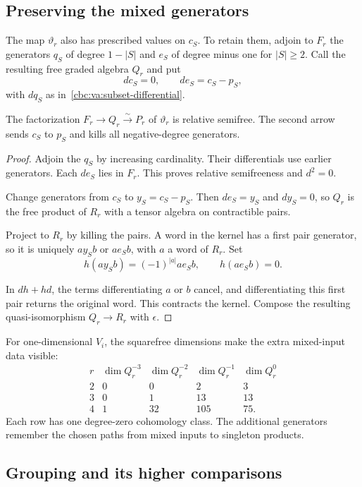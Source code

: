 \subsection{Preserving the mixed generators}

The map $\vartheta_r$ also has prescribed values
on $c_S$. To retain them, adjoin to $F_r$ the
generators $q_S$ of degree $1-|S|$ and $e_S$ of
degree minus one for $|S|\geq2$. Call the resulting
free graded algebra $Q_r$ and put
\[
 dc_S=0,\qquad de_S=c_S-p_S,
\]
with $dq_S$ as in~\eqref{cbc:va:subset-differential}.

\begin{theorem}\label{cbc:va:relative-resolution}
The factorization $F_r\longrightarrow Q_r
\xrightarrow{\sim}P_r$ of $\vartheta_r$ is
relative semifree. The second arrow sends $c_S$
to $p_S$ and kills all negative-degree generators.
\end{theorem}
\begin{proof}
Adjoin the $q_S$ by increasing cardinality.
Their differentials use earlier generators. Each
$de_S$ lies in $F_r$. This proves relative
semifreeness and $d^2=0$.

Change generators from $c_S$ to $y_S=c_S-p_S$.
Then $de_S=y_S$ and $dy_S=0$, so $Q_r$ is the
free product of $R_r$ with a tensor algebra on
contractible pairs.

Project to $R_r$ by killing the pairs.
A word in the kernel has a first pair generator,
so it is uniquely $a y_S b$ or $a e_S b$, with
$a$ a word of $R_r$. Set
\[
 h(a y_S b)=(-1)^{|a|}a e_S b,\qquad h(a e_S b)=0.
\]

In $dh+hd$, the terms differentiating $a$ or $b$
cancel, and differentiating this first pair
returns the original word. This contracts the
kernel. Compose the resulting quasi-isomorphism
$Q_r\to R_r$ with $\epsilon$.
\end{proof}

For one-dimensional $V_i$, the squarefree dimensions
make the extra mixed-input data visible:
\[
\begin{array}{c|rrrr}
 r&\dim Q_r^{-3}&\dim Q_r^{-2}&\dim Q_r^{-1}&\dim Q_r^0\\\hline
 2&0&0&2&3\\
 3&0&1&13&13\\
 4&1&32&105&75.
\end{array}
\]
Each row has one degree-zero cohomology class.
The additional generators remember the chosen
paths from mixed inputs to singleton products.

\subsection{Grouping and its higher comparisons}

